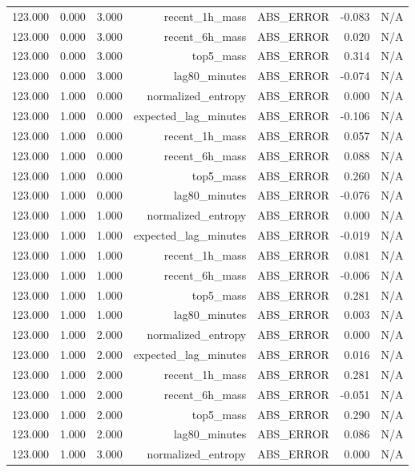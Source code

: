 \begin{table}[h!]
\begin{tabular}{lrrrrrr}
123.000 & 0.000 & 3.000 & recent\_1h\_mass & ABS\_ERROR & -0.083 & N/A \\
123.000 & 0.000 & 3.000 & recent\_6h\_mass & ABS\_ERROR & 0.020 & N/A \\
123.000 & 0.000 & 3.000 & top5\_mass & ABS\_ERROR & 0.314 & N/A \\
123.000 & 0.000 & 3.000 & lag80\_minutes & ABS\_ERROR & -0.074 & N/A \\
123.000 & 1.000 & 0.000 & normalized\_entropy & ABS\_ERROR & 0.000 & N/A \\
123.000 & 1.000 & 0.000 & expected\_lag\_minutes & ABS\_ERROR & -0.106 & N/A \\
123.000 & 1.000 & 0.000 & recent\_1h\_mass & ABS\_ERROR & 0.057 & N/A \\
123.000 & 1.000 & 0.000 & recent\_6h\_mass & ABS\_ERROR & 0.088 & N/A \\
123.000 & 1.000 & 0.000 & top5\_mass & ABS\_ERROR & 0.260 & N/A \\
123.000 & 1.000 & 0.000 & lag80\_minutes & ABS\_ERROR & -0.076 & N/A \\
123.000 & 1.000 & 1.000 & normalized\_entropy & ABS\_ERROR & 0.000 & N/A \\
123.000 & 1.000 & 1.000 & expected\_lag\_minutes & ABS\_ERROR & -0.019 & N/A \\
123.000 & 1.000 & 1.000 & recent\_1h\_mass & ABS\_ERROR & 0.081 & N/A \\
123.000 & 1.000 & 1.000 & recent\_6h\_mass & ABS\_ERROR & -0.006 & N/A \\
123.000 & 1.000 & 1.000 & top5\_mass & ABS\_ERROR & 0.281 & N/A \\
123.000 & 1.000 & 1.000 & lag80\_minutes & ABS\_ERROR & 0.003 & N/A \\
123.000 & 1.000 & 2.000 & normalized\_entropy & ABS\_ERROR & 0.000 & N/A \\
123.000 & 1.000 & 2.000 & expected\_lag\_minutes & ABS\_ERROR & 0.016 & N/A \\
123.000 & 1.000 & 2.000 & recent\_1h\_mass & ABS\_ERROR & 0.281 & N/A \\
123.000 & 1.000 & 2.000 & recent\_6h\_mass & ABS\_ERROR & -0.051 & N/A \\
123.000 & 1.000 & 2.000 & top5\_mass & ABS\_ERROR & 0.290 & N/A \\
123.000 & 1.000 & 2.000 & lag80\_minutes & ABS\_ERROR & 0.086 & N/A \\
123.000 & 1.000 & 3.000 & normalized\_entropy & ABS\_ERROR & 0.000 & N/A \\

\end{tabular}
\end{table}
